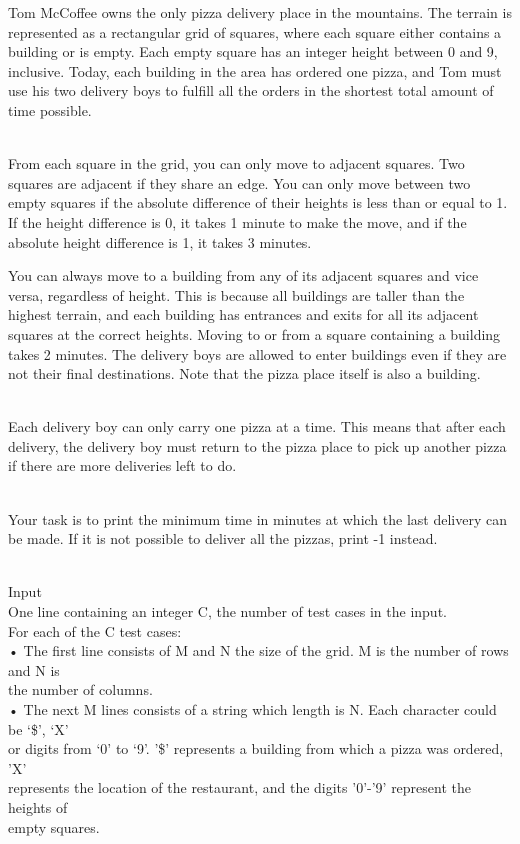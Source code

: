 



   Tom McCoffee owns the only pizza delivery place in the mountains. The terrain is represented as a rectangular grid of squares, where each square either contains a building or is empty. Each empty square has an integer height between 0 and 9, inclusive. Today, each building in the area has ordered one pizza, and Tom must use his two delivery boys to fulfill all the orders in the shortest total amount of time possible.  


\\   From each square in the grid, you can only move to adjacent squares. Two squares are adjacent if they share an edge. You can only move between two empty squares if the absolute difference of their heights is less than or equal to 1. If the height difference is 0, it takes 1 minute to make the move, and if the absolute height difference is 1, it takes 3 minutes.  

   You can always move to a building from any of its adjacent squares and vice versa, regardless of height. This is because all buildings are taller than the highest terrain, and each building has entrances and exits for all its adjacent squares at the correct heights. Moving to or from a square containing a building takes 2 minutes. The delivery boys are allowed to enter buildings even if they are not their final destinations. Note that the pizza place itself is also a building.  


\\   Each delivery boy can only carry one pizza at a time. This means that after each delivery, the delivery boy must return to the pizza place to pick up another pizza if there are more deliveries left to do.  


\\   Your task is to print the minimum time in minutes at which the last delivery can be made. If it is not possible to deliver all the pizzas, print -1 instead.  


\\   Input   
\\   One line containing an integer C, the number of test cases in the input.   
\\   For each of the C test cases:   
\\   • The first line consists of M and N the size of the grid. M is the number of rows and N is   
\\   the number of columns.   
\\   • The next M lines consists of a string which length is N. Each character could be ‘\$’, ‘X’   
\\   or digits from ‘0’ to ‘9’. '\$' represents a building from which a pizza was ordered, 'X'   
\\   represents the location of the restaurant, and the digits '0'-'9' represent the heights of   
\\   empty squares.  


